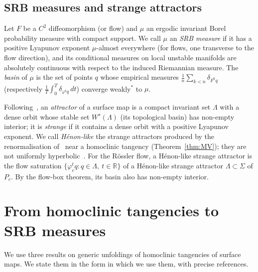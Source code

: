 \documentclass[11pt]{amsart}
\theoremstyle{definition}
\theoremstyle{remark}
\newcommand{\R}{\mathbb{R}}
\newcommand{\Ws}{W^s}
\begin{document}
\subsection{SRB measures and strange attractors}
Let $F$ be a $C^2$ diffeomorphism (or flow) and $\mu$ an ergodic invariant Borel probability measure
with compact support. We call $\mu$ an \emph{SRB measure} if it has a positive Lyapunov exponent
$\mu$-almost everywhere (for flows, one transverse to the flow direction), and its conditional measures
on local unstable manifolds are absolutely continuous with respect to the induced Riemannian measure.
The \emph{basin} of $\mu$ is the set of points $q$ whose empirical measures
$\frac1n\sum_{k<n}\delta_{F^kq}$ (respectively $\frac1T\int_0^T\delta_{\varphi^tq}\,dt$) converge
weakly$^*$ to $\mu$.

Following~\cite[p.~2]{MV93}, an \emph{attractor} of a surface map is a compact invariant set $\Lambda$ with a
dense orbit whose stable set $\Ws(\Lambda)$ (its topological basin) has non-empty interior; it is
\emph{strange} if it contains a dense orbit with a positive Lyapunov exponent. We call \emph{H\'enon-like}
the strange attractors produced by the renormalisation of~\cite{MV93} near a homoclinic tangency
(Theorem~\ref{thm:MV}); they are not uniformly hyperbolic~\cite[p.~2]{MV93}. For the R\"ossler flow, a
H\'enon-like strange attractor is the flow saturation $\{\varphi^t_cq: q\in\Lambda,\ t\in\R\}$ of a
H\'enon-like strange attractor $\Lambda\subset\Sigma$ of $P_c$. By the flow-box theorem, its basin also has
non-empty interior.

\section{From homoclinic tangencies to SRB measures}\label{sec:B}

We use three results on generic unfoldings of homoclinic tangencies of surface maps. We state them in
the form in which we use them, with precise references.
\end{document}
